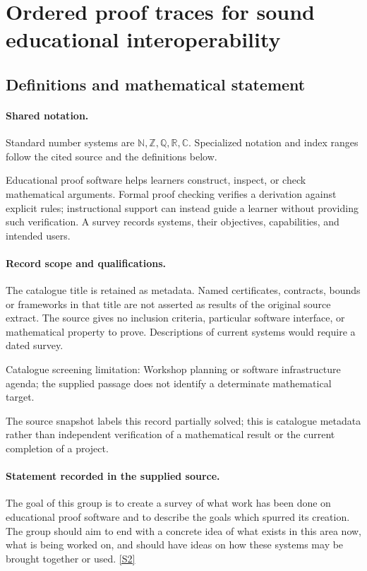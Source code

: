 \documentclass[11pt]{article}
\newcommand{\sref}[2]{\hyperlink{source:#1:#2}{[S#2]}}
\begin{document}
\section{Ordered proof traces for sound educational interoperability}\label{statement}

\subsection{Definitions and mathematical statement}

\paragraph{Shared notation.}Standard number systems are $\mathbb N,\mathbb Z,\mathbb Q,\mathbb R,\mathbb C$. Specialized notation and index ranges follow the cited source and the definitions below.


Educational proof software helps learners construct, inspect, or check mathematical arguments. Formal proof checking verifies a derivation against explicit rules; instructional support can instead guide a learner without providing such verification. A survey records systems, their objectives, capabilities, and intended users.
\paragraph{Record scope and qualifications.}
The catalogue title is retained as metadata. Named certificates, contracts, bounds or frameworks in that title are not asserted as results of the original source extract.
The source gives no inclusion criteria, particular software interface, or mathematical property to prove. Descriptions of current systems would require a dated survey.

Catalogue screening limitation: Workshop planning or software infrastructure agenda; the supplied passage does not identify a determinate mathematical target.

The source snapshot labels this record partially solved; this is catalogue metadata rather than independent verification of a mathematical result or the current completion of a project.
\paragraph{Statement recorded in the supplied source.}
The goal of this group is to create a survey of what work has been done on educational proof software and to describe the goals which spurred its creation. The group should aim to end with a concrete idea of what exists in this area now, what is being worked on, and should have ideas on how these systems may be brought together or used. \sref{statement}{2}
\end{document}
